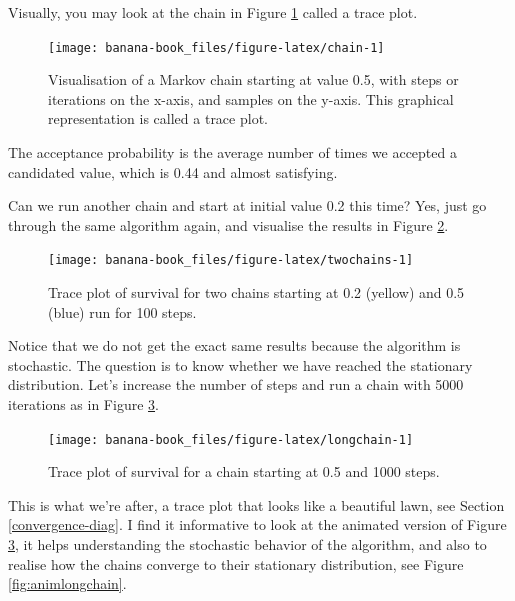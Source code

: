 \documentclass[
  12pt,
]{krantz}
\begin{document}
Visually, you may look at the chain in Figure \ref{fig:chain} called a trace plot.

\begin{figure}

{\centering \texttt{[image: banana-book\_files/figure-latex/chain-1]} 

}

\caption{Visualisation of a Markov chain starting at value 0.5, with steps or iterations on the x-axis, and samples on the y-axis. This graphical representation is called a trace plot.}\label{fig:chain}
\end{figure}

The acceptance probability is the average number of times we accepted a candidated value, which is 0.44 and almost satisfying.

Can we run another chain and start at initial value 0.2 this time? Yes, just go through the same algorithm again, and visualise the results in Figure \ref{fig:twochains}.

\begin{figure}

{\centering \texttt{[image: banana-book\_files/figure-latex/twochains-1]} 

}

\caption{Trace plot of survival for two chains starting at 0.2 (yellow) and 0.5 (blue) run for 100 steps.}\label{fig:twochains}
\end{figure}

Notice that we do not get the exact same results because the algorithm is stochastic. The question is to know whether we have reached the stationary distribution. Let's increase the number of steps and run a chain with 5000 iterations as in Figure \ref{fig:longchain}.

\begin{figure}

{\centering \texttt{[image: banana-book\_files/figure-latex/longchain-1]} 

}

\caption{Trace plot of survival for a chain starting at 0.5 and 1000 steps.}\label{fig:longchain}
\end{figure}

This is what we're after, a trace plot that looks like a beautiful lawn, see Section \ref{convergence-diag}. I find it informative to look at the animated version of Figure \ref{fig:longchain}, it helps understanding the stochastic behavior of the algorithm, and also to realise how the chains converge to their stationary distribution, see Figure \ref{fig:animlongchain}.
\end{document}
